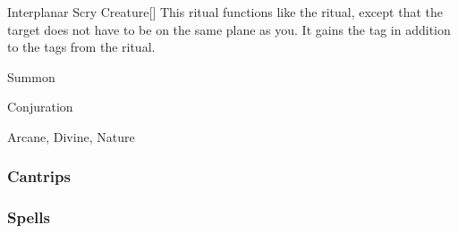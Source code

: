 \lowercase{\hypertarget{spell:Interplanar Scry Creature}{}}\label{spell:Interplanar Scry Creature}
\begin{freeability}[\nth{7}]{\hypertarget{spell:Interplanar Scry Creature}{Interplanar Scry Creature}}[]
This ritual functions like the  ritual, except that the target does not have to be on the same plane as you.
It gains the  tag in addition to the tags from the  ritual.
\end{freeability}
\vspace{0.25em}


\newpage
\begin{spellsection}{Summon}

\begin{spellheader}
\end{spellheader}


 Conjuration

 Arcane, Divine, Nature

\subsubsection{Cantrips}


\end{spellsection}


\subsubsection{Spells}


